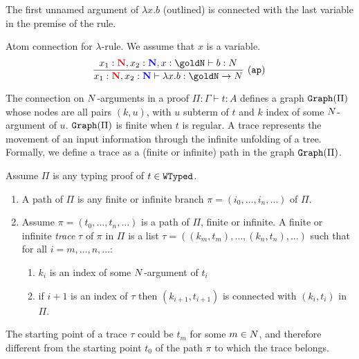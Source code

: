 The first unnamed argument of $\lambda x.b$ (outlined)
is connected with the last variable in the premise of the rule.


\begin{Eg}\label{eg:4}%
Atom connection for  $\lambda$-rule.
We assume that $x$ is  a variable.
\[
\infer[(\ap)]{
  x_1: \bfColor{red}{\N}, x_2: \bfColor{blue}{\N}
  \prove \lambda x.b : \goldN \rightarrow \N
}{
  x_1: \bfColor{red}{\N}, x_2: \bfColor{blue}{\N}, x:\goldN \prove b : \N
}
\]
\end{Eg}




The connection on ${N}$-arguments in a proof $\Pi:\Gamma\vdash t:A$ defines a 
graph ${\tt Graph}(\Pi)$ whose nodes are all pairs $(k,u)$, with $u$ subterm of $t$ and 
$k$ index of some ${N}$-argument of  $u$. ${\tt Graph}(\Pi)$ is finite when $t$ is 
regular. A trace represents the movement of an input information through the 
infinite unfolding of a tree. Formally, we define a trace as a (finite or infinite) path 
in the graph ${\tt Graph}(\Pi)$.

\begin{definition}
Assume $\Pi$ is any typing proof of $t \in {\tt WTyped}$.
\begin{enumerate}
\item
A path of $\Pi$ is any finite or infinite branch $\pi =(i_0, \ldots, i_n, \ldots)$ of $\Pi$.

\item
Assume $\pi =(t_0, \ldots, t_n, \ldots)$ is a path of $\Pi$, finite or infinite. 
A finite or infinite \emph{trace} $\tau$ of $\pi$ in $\Pi$ is a list 
$\tau =( (k_m,t_m), \ldots, (k_n,t_n), \ldots)$ such that for all $i=m,\ldots, n,\ldots$:
\begin{enumerate}
\item
$k_i$ is an index of some ${N}$-argument of $t_i$
\item
if $i+1$ is an index of $\tau$ then $(k_{i+1},t_{i+1})$ is connected with $(k_i, t_i)$ in $\Pi$.
\end{enumerate}

\end{enumerate}
\end{definition}

The starting point of a trace $\tau$ could be $t_m$ for some $m \in {N}$, 
and therefore different from the starting point $t_0$ of the path $\pi$ to which the 
trace belongs.

